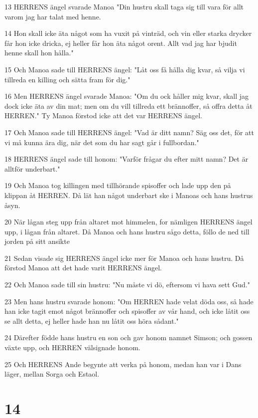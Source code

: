 \par 13 HERRENS ängel svarade Manoa "Din hustru skall taga sig till vara för allt varom jag har talat med henne.
\par 14 Hon skall icke äta något som ha vuxit på vinträd, och vin eller starka drycker får hon icke dricka, ej heller får hon äta något orent. Allt vad jag har bjudit henne skall hon hålla."
\par 15 Och Manoa sade till HERRENS ängel: "Låt oss få hålla dig kvar, så vilja vi tillreda en killing och sätta fram för dig."
\par 16 Men HERRENS ängel svarade Manoa: "Om du ock håller mig kvar, skall jag dock icke äta av din mat; men om du vill tillreda ett brännoffer, så offra detta åt HERREN." Ty Manoa förstod icke att det var HERRENS ängel.
\par 17 Och Manoa sade till HERRENS ängel: "Vad är ditt namn? Säg oss det, för att vi må kunna ära dig, när det som du har sagt går i fullbordan."
\par 18 HERRENS ängel sade till honom: "Varför frågar du efter mitt namn? Det är alltför underbart."
\par 19 Och Manoa tog killingen med tillhörande spisoffer och lade upp den på klippan åt HERREN. Då lät han något underbart ske i Manoas och hans hustrus åsyn.
\par 20 När lågan steg upp från altaret mot himmelen, for nämligen HERRENS ängel upp, i lågan från altaret. Då Manoa och hans hustru sågo detta, föllo de ned till jorden på sitt ansikte
\par 21 Sedan visade sig HERRENS ängel icke mer för Manoa och hans hustru. Då förstod Manoa att det hade varit HERRENS ängel.
\par 22 Och Manoa sade till sin hustru: "Nu måste vi dö, eftersom vi hava sett Gud."
\par 23 Men hans hustru svarade honom: "Om HERREN hade velat döda oss, så hade han icke tagit emot något brännoffer och spisoffer av vår hand, och icke låtit oss se allt detta, ej heller hade han nu låtit oss höra sådant."
\par 24 Därefter födde hans hustru en son och gav honom namnet Simson; och gossen växte upp, och HERREN välsignade honom.
\par 25 Och HERRENS Ande begynte att verka på honom, medan han var i Dans läger, mellan Sorga och Estaol.

\chapter{14}

